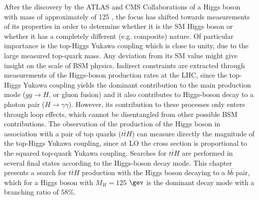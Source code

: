 
After the discovery by the ATLAS and CMS Collaborations of a Higgs boson with mass of approximately of 125 \gev, the focus has shifted towards measurements of its properties in order to determine whether it is the SM Higgs boson or whether it has a completely different (e.g. composite) nature. Of particular importance is the top-Higgs Yukawa coupling which is close to unity, due to the large measured top-quark mass. Any deviation from its SM value might give insight on the scale of BSM physics. Indirect constraints are extracted through measurements of the Higgs-boson production rates at the LHC, since the top-Higgs Yukawa coupling yields the dominant contribution to the main production mode ($gg\to H$, or gluon fusion) and it also contributes to Higgs-boson decay to a photon pair ($H\to \gamma \gamma$). However, its contribution to these processes only enters through loop effects, which cannot be disentangled from other possible BSM contributions. The observation of the production of the Higgs boson in association with a pair of top quarks ($t\bar{t}H$) can measure directly the  magnitude of the top-Higgs Yukawa coupling, since at LO the cross section is proportional to the squared top-quark Yukawa coupling. Searches for $t\bar{t}H$ are performed in several final states according to the Higgs-boson decay mode. This chapter presents a search for $t\bar{t}H$ production with the Higgs boson decaying to a $b\bar{b}$ pair, which for a Higgs boson with $M_H=125$ $\gev$ is the dominant decay mode with a branching ratio of $58\%$. 



